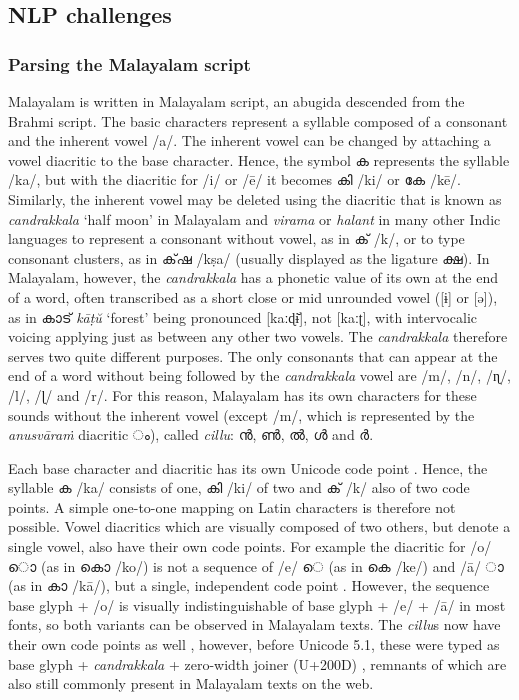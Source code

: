\documentclass[a4paper]{article}
\newcommand{\ipa}[1]{{\cmuIPA{}#1}}
\begin{document}
\subsection{NLP challenges}

\subsubsection{Parsing the Malayalam script}

Malayalam is written in Malayalam script, an abugida descended from the Brahmi script. The basic characters represent a syllable composed of a consonant and the inherent vowel /a/. The inherent vowel can be changed by attaching a vowel diacritic to the base character. Hence, the symbol ക represents the syllable /ka/, but with the diacritic for /i/ or /ē/ it becomes കി /ki/ or കേ /kē/. Similarly, the inherent vowel may be deleted using the diacritic that is known as \textit{candrakkala} `half moon' in Malayalam and \textit{virama} or \textit{halant} in many other Indic languages to represent a consonant without vowel, as in ക് /k/, or to type consonant clusters, as in ക്​ഷ /kṣa/ (usually displayed as the ligature ക്ഷ). In Malayalam, however, the \textit{candrakkala} has a phonetic value of its own at the end of a word, often transcribed as a short close or mid unrounded vowel ([\ipa{ɨ}] or [\ipa{ə}]), as in കാട് \textit{kāṭŭ} `forest' being pronounced [\ipa{kaːɖɨ̆}], not [\ipa{kaːʈ}], with intervocalic voicing applying just as between any other two vowels. The \textit{candrakkala} therefore serves two quite different purposes. The only consonants that can appear at the end of a word without being followed by the \textit{candrakkala} vowel are /m/, /n/, /\ipa{ɳ}/, /l/, /\ipa{ɭ}/ and /r/. For this reason, Malayalam has its own characters for these sounds without the inherent vowel (except /m/, which is represented by the \textit{anusvāraṁ} diacritic ം), called \textit{cillu}: ൻ, ൺ, ൽ, ൾ and ർ.

Each base character and diacritic has its own Unicode code point \parencite[p.~334ff]{unicode5}. Hence, the syllable ക /ka/ consists of one, കി /ki/ of two and ക് /k/ also of two code points. A simple one-to-one mapping on Latin characters is therefore not possible. Vowel diacritics which are visually composed of two others, but denote a single vowel, also have their own code points. For example the diacritic for /o/ ൊ (as in കൊ /ko/) is not a sequence of /e/ െ (as in കെ /ke/) and /ā/ ാ (as in കാ /kā/), but a single, independent code point \parencite[p.~334f]{unicode5}. However, the sequence base glyph + /o/ is visually indistinguishable of base glyph + /e/ + /ā/ in most fonts, so both variants can be observed in Malayalam texts. The \textit{cillu}s now have their own code points as well \parencite{unicode51}, however, before Unicode 5.1, these were typed as base glyph + \textit{candrakkala} + zero-width joiner (U+200D) \parencite[p.~336f]{unicode5}, remnants of which are also still commonly present in Malayalam texts on the web.
\end{document}
